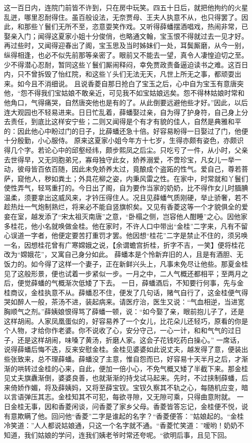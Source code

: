 \documentclass[12pt,oneside]{book}
\begin{document}
这一百日内，连院门前皆不许到，只在房中玩笑。四五十日后，就把他拘约的火星乱迸，哪里忍耐得住。虽百般设法，无奈贾母、王夫人执意不从，也只得罢了。因此，和那些丫鬟们无所不至，恣意耍笑作戏。又听得薛蟠摆酒唱戏，热闹非常，已娶亲入门；闻得这夏家小姐十分俊俏，也略通文翰，宝玉恨不得就过去一见才好。再过些时，又闻得迎春出了阁，宝玉思及当时姊妹们一处，耳鬓厮磨，从今一别，纵得相逢，也必不似先前那等亲密了。眼前又不能去一望，真令人凄惶迫切之至。少不得潜心忍耐，暂同这些丫鬟们厮闹释闷，幸免贾政责备逼迫读书之难。这百日内，只不曾拆毁了怡红院，和这些丫头们无法无天，凡世上所无之事，都顽耍出来。如今且不消细说。
且说香菱自那日抢白了宝玉之后，心中自为宝玉有意唐突他，“怨不得我们宝姑娘不敢亲近，可见我不如宝姑娘远矣。怨不得林姑娘时常和他角口，气得痛哭，自然唐突他也是有的了。从此倒要远避他些才好。”因此，以后连大观园也不轻易进来。日日忙乱着，薛蟠娶过亲，自为得了护身符，自己身上分去责任，到底比这样安宁些；二则又闻得是个有才有貌的佳人，自然是典雅和平的：因此他心中盼过门的日子，比薛蟠还急十倍。好容易盼得一日娶过了门，他便十分殷勤，小心服侍。
原来这夏家小姐今年方十七岁，生得亦颇有姿色，亦颇识得几个字。若论心中的邱壑经纬，颇步熙凤之后尘。只吃亏了一件，从小时，父亲去世得早，又无同胞弟兄，寡母独守此女，娇养溺爱，不啻珍宝，凡女儿一举一动，彼母皆百依百随，因此未免娇养太过，竟酿成个盗跖的性气。爱自己，尊若菩萨，窥他人，秽如粪土；外具花柳之姿，内秉风雷之性。在家中，时常就和丫鬟们使性弄气，轻骂重打的。今日出了阁，自为要作当家的奶奶，比不得作女儿时腼腆温柔，须要拿出这威风来，才钤压得住人。况且见薛蟠气质刚硬，举止骄奢，若不趁热灶一气炮制熟烂，将来必不能自竖旗帜矣。又见有香菱这等一个才貌俱全的爱妾在室，越发添了“宋太祖灭南唐”之意，“卧榻之侧，岂容他人酣睡”之心。因他家多桂花，他小名就唤做金桂。他在家时，不许人口中带出“金桂”二字来，凡有不留心误道一字者，他便定要苦打重罚才罢。他因想“桂花”二字是禁止不住的，须另唤一名，因想桂花曾有广寒嫦娥之说，【余谓蟾宫折桂，折字不吉，一笑】便将桂花改为“嫦娥花”，又寓自己身分如此。
薛蟠本是个怜新弃旧的人，且是有酒胆、无饭力的。如今得了这样一个妻子，正在新鲜兴头上，凡事未免尽让他些。那夏金桂见了这般形景，便也试着一步紧似一步。一月之中，二人气概还都相平；至两月之后，便觉薛蟠的气概渐次低矮了下去。
一日，薛蟠酒后，不知要行何事，先与金桂商议，金桂执意不从。薛蟠忍不住，便发了几句话，赌气自行了，这金桂便气得哭如醉人一般，茶汤不进，装起病来。请医疗治，医生又说：“气血相逆，当进宽胸顺气之剂。”薛姨娘恨得骂了薛蟠一顿，说：“如今娶了亲，眼前抱儿子了，还是这样胡闹。人家凤凰蛋似的，好容易养了一个女儿，比花朵儿还轻巧，原看的你是个人物，才给你作老婆。你不说收了心，安分守己，一心一计，和和气气的过日子，还是这样胡闹，味嗓了黄汤，折磨人家。这会子花钱吃药白操心。”
一席话，说得薛蟠后悔不迭，反来安慰金桂。金桂见婆婆如此说丈夫，越发得了意，便装出些张致来，总不理薛蟠。薛蟠没了主意，惟自怨而已，好容易十天半月之后，才渐渐的哄转过金桂的心来，自此，便加一倍小心，不免气概又矮了半截下来。那金桂见丈夫旗纛渐倒，婆婆良善，也就渐渐的持戈试马起来。先时，不过挟制薛蟠，后来倚娇作媚，将及薛姨妈，又将至薛宝钗。宝钗久察其不轨之心，每随机应变，暗以言语弹压其志。金桂知其不可犯，每欲寻隙，又无隙可乘，只得曲意附就。
一日金桂无事，因和香菱闲谈，问香菱了家乡父母。香菱皆答忘记，金桂便不悦，说有意欺瞒了他。回问他“香菱”二字是谁起的名字？“香菱便答：”姑娘起的。“金桂冷笑道：”人人都说姑娘通，只这一个名字就不通。“香菱忙笑道：”嗳哟！奶奶不知道，我们姑娘的学问，连我们姨老爷时常还夸呢。“欲明后事，且见下回。
\end{document}
